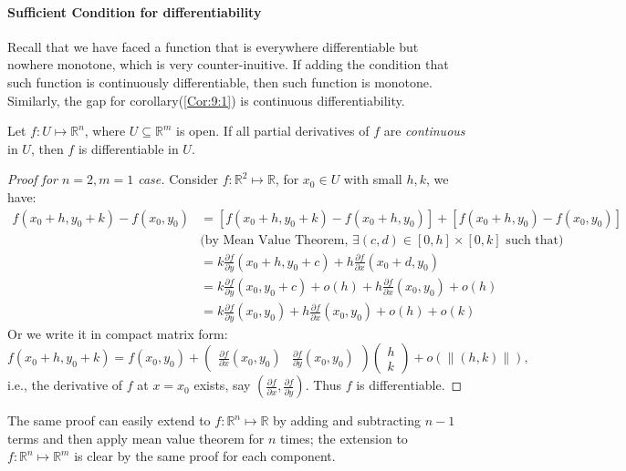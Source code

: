 \paragraph{Sufficient Condition for differentiability}
Recall that we have faced a function that is everywhere differentiable but nowhere monotone, which is very counter-inuitive. If adding the condition that such function is continuously differentiable, then such function is monotone. Similarly, the gap for corollary(\ref{Cor:9:1}) is continuous differentiability.
\begin{theorem}
Let $f:U\mapsto\mathbb{R}^n$, where $U\subseteq\mathbb{R}^m$ is open. If all partial derivatives of $f$ are \emph{continuous} in $U$, then $f$ is differentiable in $U$.
\end{theorem}
\begin{proof}[Proof for $n=2,m=1$ case]
Consider $f:\mathbb{R}^2\mapsto\mathbb{R}$, for $x_0\in U$ with small $h,k$, we have:
\begin{subequations}
\begin{align}
f(x_0+h,y_0+k) - f(x_0,y_0)&=[f(x_0+h,y_0+k) - f(x_0+h,y_0)] + [f(x_0+h,y_0) - f(x_0,y_0)]\\
&\mbox{(by Mean Value Theorem, $\exists (c,d)\in[0,h]\times[0,k]$ such that)}\\
&=k\frac{\partial f}{\partial y}(x_0+h,y_0+c) + h\frac{\partial f}{\partial x}(x_0+d,y_0)\\
&=k\frac{\partial f}{\partial y}(x_0,y_0+c)+o(h)+h\frac{\partial f}{\partial x}(x_0,y_0)+o(h)\\
&=k\frac{\partial f}{\partial y}(x_0,y_0)+h\frac{\partial f}{\partial x}(x_0,y_0)+o(h)+o(k)
\end{align}
\end{subequations}
Or we write it in compact matrix form:
\[
f(x_0+h,y_0+k)=f(x_0,y_0)+\begin{pmatrix}
\frac{\partial f}{\partial x}(x_0,y_0)&
\frac{\partial f}{\partial y}(x_0,y_0)
\end{pmatrix}\begin{pmatrix}
h\\k
\end{pmatrix}+o(\|(h,k)\|),
\]
i.e., the derivative of $f$ at $x=x_0$ exists, say $(\frac{\partial f}{\partial x},\frac{\partial f}{\partial y})$. Thus $f$ is differentiable.
\end{proof}
The same proof can easily extend to $f:\mathbb{R}^n\mapsto\mathbb{R}$ by adding and subtracting $n-1$ terms and then apply mean value theorem for $n$ times; the extension to $f:\mathbb{R}^n\mapsto\mathbb{R}^m$ is clear by the same proof for each component.






